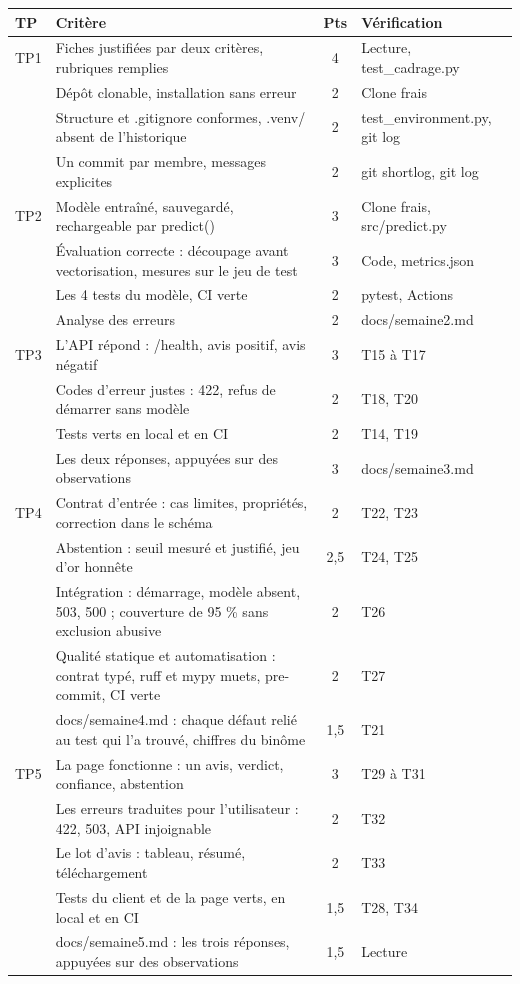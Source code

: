 \documentclass[11pt,a4paper]{article}
\newcommand{\co}[1]{{\ttfamily\hyphenchar\font=45\relax #1}}
\begin{document}
\begin{center}
\small
\begin{tabularx}{\textwidth}{@{}l X c >{\raggedright\arraybackslash}p{4.6cm}@{}}
\toprule
\textbf{TP} & \textbf{Critère} & \textbf{Pts} & \textbf{Vérification} \\
\midrule
TP1 & Fiches justifiées par deux critères, rubriques remplies & 4 & Lecture, \co{test\_cadrage.py} \\
    & Dépôt clonable, installation sans erreur & 2 & Clone frais \\
    & Structure et \co{.gitignore} conformes, \co{.venv/} absent de l'historique & 2 & \co{test\_environment.py}, \co{git log} \\
    & Un commit par membre, messages explicites & 2 & \co{git shortlog}, \co{git log} \\
\midrule
TP2 & Modèle entraîné, sauvegardé, rechargeable par \co{predict()} & 3 & Clone frais, \co{src/predict.py} \\
    & Évaluation correcte : découpage avant vectorisation, mesures sur le jeu de test & 3 & Code, \co{metrics.json} \\
    & Les 4 tests du modèle, CI verte & 2 & pytest, Actions \\
    & Analyse des erreurs & 2 & \co{docs/semaine2.md} \\
\midrule
TP3 & L'API répond : \co{/health}, avis positif, avis négatif & 3 & T15 à T17 \\
    & Codes d'erreur justes : 422, refus de démarrer sans modèle & 2 & T18, T20 \\
    & Tests verts en local et en CI & 2 & T14, T19 \\
    & Les deux réponses, appuyées sur des observations & 3 & \co{docs/semaine3.md} \\
\midrule
TP4 & Contrat d'entrée : cas limites, propriétés, correction dans le schéma & 2 & T22, T23 \\
    & Abstention : seuil mesuré et justifié, jeu d'or honnête & 2,5 & T24, T25 \\
    & Intégration : démarrage, modèle absent, 503, 500 ; couverture de 95 \% sans exclusion abusive & 2 & T26 \\
    & Qualité statique et automatisation : contrat typé, ruff et mypy muets, pre-commit, CI verte & 2 & T27 \\
    & \co{docs/semaine4.md} : chaque défaut relié au test qui l'a trouvé, chiffres du binôme & 1,5 & T21 \\
\midrule
TP5 & La page fonctionne : un avis, verdict, confiance, abstention & 3 & T29 à T31 \\
    & Les erreurs traduites pour l'utilisateur : 422, 503, API injoignable & 2 & T32 \\
    & Le lot d'avis : tableau, résumé, téléchargement & 2 & T33 \\
    & Tests du client et de la page verts, en local et en CI & 1,5 & T28, T34 \\
    & \co{docs/semaine5.md} : les trois réponses, appuyées sur des observations & 1,5 & Lecture \\
\bottomrule
\end{tabularx}
\end{center}
\end{document}
